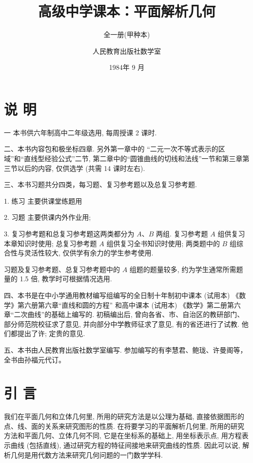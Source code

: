 \documentclass[lang=cn,newtx,10pt,scheme=chinese]{elegantbook}
\title{高级中学课本：平面解析几何}
\subtitle{全一册(甲种本)}
\author{人民教育出版社数学室}
\institute{人民教育出版社}
\date{1984年 9 月}
\begin{document}
\maketitle

\chapter*{说 明}

  一 本书供六年制高中二年级选用, 每周授课 2 课时.

  二、本书内容包和极坐标四章. 另外第一章中的 “二元一次不等式表示的区域”和“直线型经验公式”二节, 第二章中的“圆锥曲线的切线和法线”一节和第三章第三节以后的内容, 仅供选学 (共需 14 课时左右).

  三、本书习题共分四类，每习题、复习参考题以及总复习参考题.

  1. 练习 主要供课堂练题用

  2. 习题 主要供课内外作业用;

  3. 复习参考题和总复习参考题这两类都分为 \(A\text{、}B\) 两组. 复习参考题 \(A\) 组供复习本章知识时使用; 总复习参考题 \(A\) 组供复习全书知识时使用; 两类题中的 \(B\) 组综合性与灵活性较大, 仅供学有余力的学生参考使用.

  习题及复习参考题、总复习参考题中的 \(A\) 组题的题量较多, 约为学生通常所需题量的 1.5 倍, 教学时可根据情况选用.

  四、本书是在中小学通用教材编写组编写的全日制十年制初中课本 (试用本) 《数学》第六册第六章“直线和圆的方程” 和高中课本 (试用本) 《数学》第二册第六章“二次曲线”的基础上编写的. 初稿编出后, 曾向各省、市、自治区的教研部门、部分师范院校征求了意见, 并向部分中学教师征求了意见, 有的省还进行了试教. 他们都提出了许; 定贵的意见.

  五、本书由人民教育出版社数学室编写. 参加编写的有李慧君、鲍珑、许曼阁等，全书由孙福元代订。
\frontmatter

\tableofcontents

\mainmatter

\chapter*{引 言}

我们在平面几何和立体几何里, 所用的研究方法是以公理为基础, 直接依据图形的点、线、面的关系来研究图形的性质. 在将要学习的平面解析几何里, 所用的研究方法和平面几何、立体几何不同, 它是在坐标系的基础上, 用坐标表示点, 用方程表示曲线 (包括直线), 通过研究方程的特征间接地来研究曲线的性质. 因此可以说, 解析几何是用代数方法来研究几何问题的一门数学学科.
\end{document}
